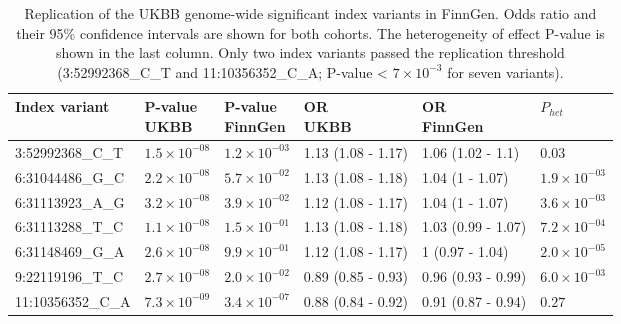 


\begin{table}[H]
  \centering\begingroup\fontsize{10}{12}\selectfont
  
  \caption[Replication of the UKBB genome-wide significant index variants in FinnGen]{Replication of the UKBB genome-wide significant index variants in FinnGen. Odds ratio and their 95\% confidence intervals are shown for both cohorts. The heterogeneity of effect P-value is shown in the last column. Only two index variants passed the replication threshold (3:52992368\_C\_T  and 11:10356352\_C\_A; P-value < $7\times10^{-3}$ for seven variants).}
  \label{table:replication_ukbb_in_finngen}
  \begin{tabular}[t]{llllll}
  \toprule
  Index variant & \makecell{P-value\\ UKBB} & \makecell{P-value\\ FinnGen} & \makecell{OR\\ UKBB} & \makecell{OR\\ FinnGen} & $P_{het}$\\
  \midrule
  3:52992368\_C\_T & $1.5\times10^{-08}$ & $1.2\times10^{-03}$ & 1.13 (1.08 - 1.17) & 1.06 (1.02 - 1.1) & $0.03$\\
  6:31044486\_G\_C & $2.2\times10^{-08}$ & $5.7\times10^{-02}$ & 1.13 (1.08 - 1.18) & 1.04 (1 - 1.07) & $1.9\times10^{-03}$\\
  6:31113923\_A\_G & $3.2\times10^{-08}$ & $3.9\times10^{-02}$ & 1.12 (1.08 - 1.17) & 1.04 (1 - 1.07) & $3.6\times10^{-03}$\\
  6:31113288\_T\_C & $1.1\times10^{-08}$ & $1.5\times10^{-01}$ & 1.13 (1.08 - 1.18) & 1.03 (0.99 - 1.07) & $7.2\times10^{-04}$\\
  6:31148469\_G\_A & $2.6\times10^{-08}$ & $9.9\times10^{-01}$ & 1.12 (1.08 - 1.17) & 1 (0.97 - 1.04) & $2.0\times10^{-05}$\\
  9:22119196\_T\_C & $2.7\times10^{-08}$ & $2.0\times10^{-02}$ & 0.89 (0.85 - 0.93) & 0.96 (0.93 - 0.99) & $6.0\times10^{-03}$\\
  11:10356352\_C\_A & $7.3\times10^{-09}$ & $3.4\times10^{-07}$ & 0.88 (0.84 - 0.92) & 0.91 (0.87 - 0.94) & $0.27$\\
  \bottomrule
  \end{tabular}
  \endgroup{}
  \end{table}





